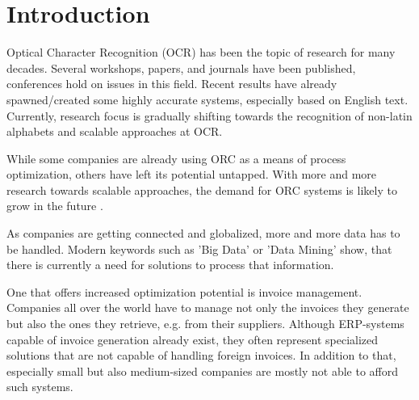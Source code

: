 %
% 

\chapter{Introduction}
\label{cha1}
Optical Character Recognition (OCR) has been the topic of research for many decades. 
Several workshops, papers, and journals have been published, conferences hold on issues in this field. %
Recent results have already spawned/created some highly accurate systems, especially based on English text. Currently, research focus is gradually shifting towards the recognition of non-latin alphabets and scalable approaches at OCR. %

While some companies are already using ORC as a means of process optimization, others have left its potential untapped. With more and more research towards scalable approaches, the demand for ORC systems is likely to grow in the future \cite{Klein04}\cite{Attaran01}\cite{Billentis16}.

As companies are getting connected and globalized, more and more data has to be handled. Modern keywords such as 'Big Data' or 'Data Mining' show, that there is currently a need for solutions to process that information.

One that offers increased optimization potential is invoice management. Companies all over the world have to manage not only the invoices they generate but also the ones they retrieve, e.g. from their suppliers.
Although ERP-systems capable of invoice generation already exist, they often represent specialized solutions that are not capable of handling foreign invoices. In addition to that, especially small but also medium-sized companies are mostly not able to afford such systems. 

